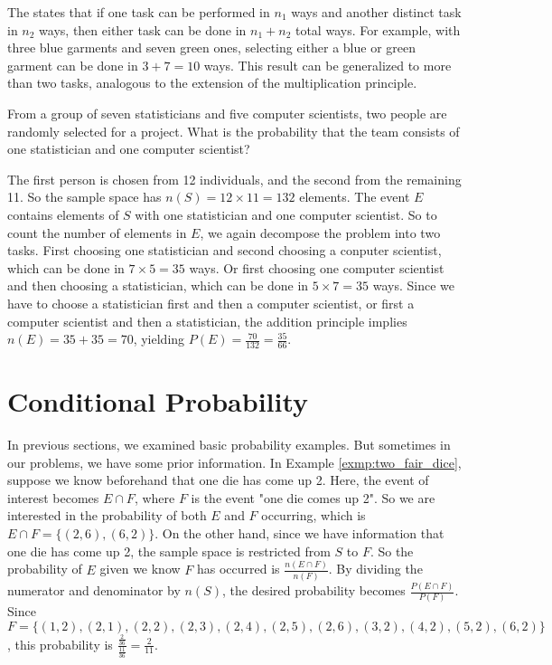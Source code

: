 The  states that if one task can be performed in \( n_1 \) ways and another distinct task in \( n_2 \) ways,
then either task can be done in \( n_1 + n_2 \) total ways.
For example, with three blue garments and seven green ones,
selecting either a blue or green garment can be done in \( 3 + 7 = 10 \) ways.
This result can be generalized to more than two tasks, analogous to the extension of the multiplication principle.

\begin{exmp}
	From a group of seven statisticians and five computer scientists, two people are randomly selected for a project.
	What is the probability that the team consists of one statistician and one computer scientist?
\end{exmp}
\begin{solution}
	The first person is chosen from 12 individuals, and the second from the remaining 11.
	So the sample space has \( n(S) = 12 \times 11 = 132 \) elements.
	The event \( E \) contains elements of \( S \) with one statistician and one computer scientist.
	So to count the number of elements in \( E \), we again decompose the problem into two tasks.
	First choosing one statistician and second choosing a conputer scientist,
	which can be done in \( 7 \times 5 = 35 \) ways.
	Or first choosing one computer scientist and then choosing a statistician,
	which can be done in \( 5 \times 7 = 35 \) ways.
	Since we have to choose a statistician first and then a computer scientist, or first a computer scientist and then a statistician,
	the addition principle implies \( n(E) = 35 + 35 = 70 \), yielding \( P(E) = \frac{70}{132} = \frac{35}{66} \).
\end{solution}

\section{Conditional Probability}

In previous sections, we examined basic probability examples.
But sometimes in our problems, we have some prior information.
In Example \autoref{exmp:two_fair_dice}, suppose we know beforehand that one die has come up 2.
Here, the event of interest becomes \( E \cap F \), where \( F \) is the event "one die comes up 2".
So we are interested in the probability of both \( E \) and \( F \) occurring, which is \( E \cap F = \{ (2, 6), (6, 2) \} \).
On the other hand, since we have information that one die has come up 2, the sample space is restricted from \( S \) to \( F \).
So the probability of \( E \) given we know \( F \) has occurred is \( \frac{n(E \cap F)}{n(F)} \).
By dividing the numerator and denominator by \( n(S) \), the desired probability becomes \( \frac{P(E \cap F)}{P(F)} \).
Since \( F = \{ (1, 2), (2, 1), (2, 2), (2, 3), (2, 4), (2, 5), (2, 6), (3, 2), (4, 2), (5, 2), (6, 2) \} \),
this probability is \( \frac{\frac{2}{36}}{\frac{11}{36}} = \frac{2}{11} \).

